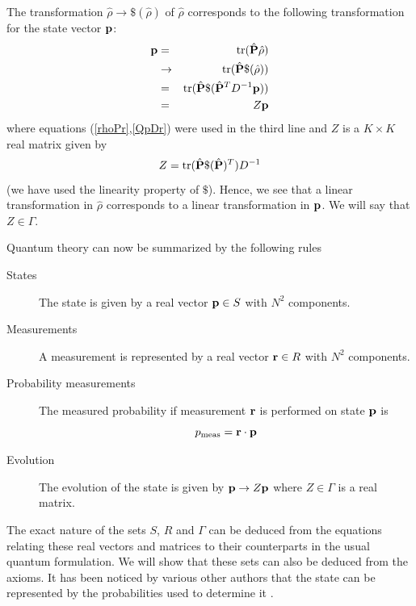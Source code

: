 \documentclass[10pt,twocolumn]{article}
\begin{document}
The transformation $\hat{\rho}\rightarrow \$ (\hat{\rho})$
of $\hat{\rho}$ corresponds to the following transformation for
the state vector ${\bf p}$:
\begin{eqnarray*}
{\bf p}
& = & {\rm tr}(\hat{\bf P}\hat{\rho})            \\
&\rightarrow & {\rm tr} (\hat{\bf P} \$(\hat{\rho})) \\
& = & {\rm tr} (\hat{\bf P} \$(\hat{\bf P}^T D^{-1} {\bf p})) \\
& = & Z {\bf p}
\end{eqnarray*}
where equations (\ref{rhoPr},\ref{QpDr}) were used in the third line and
$Z$ is a $K\times K$ real matrix given by
\begin{equation}\label{transprho}
Z={\rm tr}(\hat{\bf P}\$(\hat{\bf P})^T) D^{-1}
\end{equation}
(we have used the linearity property of $\$ $). Hence, we see that a linear
transformation in $\hat{\rho}$ corresponds to a linear transformation in ${\bf
p}$. We will say that $Z\in\Gamma$.

Quantum theory can now be summarized by the following rules
\begin{description}
\item[States] The state is given by a real vector ${\bf p}\in S$ with
$N^2$ components.
\item[Measurements] A measurement is represented by a real vector ${\bf
r}\in R$ with $N^2$ components.
\item[Probability measurements] The measured probability if measurement
${\bf r}$ is performed on state ${\bf p}$ is
\[ p_{\rm meas}= {\bf r}\cdot {\bf p}  \]
\item[Evolution] The evolution of the state is given by ${\bf
p}\rightarrow Z {\bf p}$ where $Z\in\Gamma$ is a real matrix.
\end{description}
The exact nature of the sets $S$, $R$ and $\Gamma$ can be deduced from
the equations relating these real vectors and matrices to their
counterparts in the usual quantum formulation.  We will show that these
sets can also be deduced from the
axioms. It has been noticed by various other authors that the state can
be represented by the probabilities used to determine it
\cite{wootters,stefan}.
\end{document}
